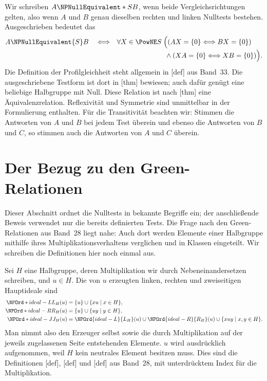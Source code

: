 Wir schreiben \(A\NPNullEquivalent*{S} B\), wenn beide Vergleichsrichtungen gelten,
also wenn \(A\) und \(B\) genau dieselben rechten und linken Nulltests
bestehen. Ausgeschrieben bedeutet das
\[
 \begin{aligned}
 A\NPNullEquivalent{S} B\quad\Longleftrightarrow\quad
 &\forall X\in\PowNE S\;\Bigl(
 (AX=\{0\}\Longleftrightarrow BX=\{0\})\\[-2pt]
 &\hspace{7em}\land(XA=\{0\}\Longleftrightarrow XB=\{0\})\Bigr).
 \end{aligned}
\]
Die Definition der Profilgleichheit steht allgemein in
[def] aus Band~33.
Die ausgeschriebene Testform ist dort in
[thm] bewiesen; auch dafür
genügt eine beliebige Halbgruppe mit Null.
Diese Relation ist nach [thm]
eine Äquivalenzrelation. Reflexivität und Symmetrie
sind unmittelbar in der Formulierung enthalten. Für die Transitivität
beachten wir: Stimmen die Antworten von \(A\) und \(B\) bei jedem Test
überein und ebenso die Antworten von \(B\) und \(C\), so stimmen auch
die Antworten von \(A\) und \(C\) überein.

\section*{Der Bezug zu den Green-Relationen}

Dieser Abschnitt ordnet die Nulltests in bekannte Begriffe ein;
der anschließende Beweis verwendet nur die bereits definierten Tests.
Die Frage nach den Green-Relationen aus Band~28 liegt nahe: Auch dort
werden Elemente einer Halbgruppe mithilfe ihres Multiplikationsverhaltens
verglichen und in Klassen eingeteilt. Wir schreiben die Definitionen
hier noch einmal aus.

Sei \(H\) eine Halbgruppe, deren Multiplikation wir durch
Nebeneinandersetzen schreiben, und \(u\in H\). Die von \(u\)
erzeugten linken, rechten und zweiseitigen Hauptideale sind
\[
 \begin{aligned}
 \NPOrd*{ideal-L}{L_H}(u)&=\{u\}\cup\{xu\mid x\in H\},\\
 \NPOrd*{ideal-R}{R_H}(u)&=\{u\}\cup\{uy\mid y\in H\},\\
 \NPOrd*{ideal-J}{J_H}(u)&=\NPOrd{ideal-L}{L_H}(u)\cup \NPOrd{ideal-R}{R_H}(u)\cup\{xuy\mid x,y\in H\}.
 \end{aligned}
\]
Man nimmt also den Erzeuger selbst sowie die durch Multiplikation
auf der jeweils zugelassenen Seite entstehenden Elemente.
\(u\) wird ausdrücklich aufgenommen, weil \(H\) kein neutrales
Element besitzen muss. Dies sind die Definitionen
[def],
[def] und
[def] aus Band~28,
mit unterdrücktem Index für die Multiplikation.

